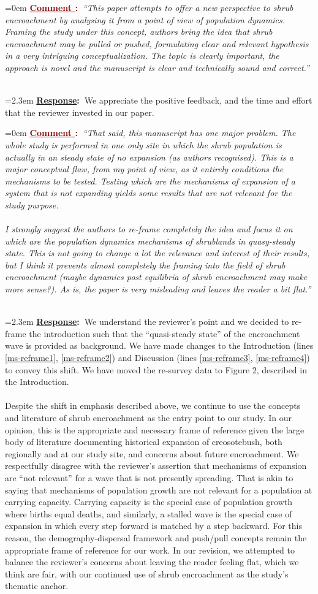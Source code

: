 \documentclass[12pt]{article}
\newcounter{cN}
\newcommand{\comment}[1]{
	\vspace{2em}
	\refstepcounter{cN} %
	\noindent \hangindent=0em \textbf{\textcolor{Maroon}{\uline{Comment \thecN}:~}}\emph{``#1''}
	}
\newcommand{\response}[1]{
	\\[0.25em]
	\hangindent=2.3em \textbf{\textcolor{NavyBlue}{\uline{Response}:~}}#1
	}
\begin{document}
\comment{This paper attempts to offer a new perspective to shrub encroachment by analysing it from a point of view of population dynamics. Framing the study under this concept, authors bring the  idea that shrub encroachment may be pulled or pushed, formulating clear and relevant hypothesis in a very intriguing conceptualization. The topic is clearly important, the approach is novel and the manuscript is clear and technically sound and correct.}
\response{We appreciate the positive feedback, and the time and effort that the reviewer invested in our paper.}

\comment{That said, this manuscript has one major problem. The whole study is performed in one only site in which the shrub population is actually in an steady state of no expansion (as authors recognised). This is a major conceptual flaw, from my point of view, as it entirely conditions the mechanisms to be tested. Testing which are the mechanisms of expansion of a system that is not expanding yields some results that are not relevant for the study purpose.
	\\
	\\
I strongly suggest the authors to re-frame completely the idea and focus it on which are the population dynamics mechanisms of shrublands in quasy-steady state. This is not going to change a lot the relevance and interest of their results, but I think it prevents almost completely the framing into the field of shrub encroachment (maybe dynamics post equilibria of shrub encroachment may make more sense?). As is, the paper is very misleading and leaves the reader a bit flat.}
\response{We understand the reviewer's point and we decided to re-frame the introduction such that the ``quasi-steady state'' of the encroachment wave is provided as background. We have made changes to the Introduction (lines \ref{ms-reframe1}, \ref{ms-reframe2}) and Discussion (lines \ref{ms-reframe3}, \ref{ms-reframe4}) to convey this shift. We have moved the re-survey data to Figure 2, described in the Introduction. 
\\
\\
Despite the shift in emphasis described above, we continue to use the concepts and literature of shrub encroachment as the entry point to our study. In our opinion, this is the appropriate and necessary frame of reference given the large body of literature documenting historical expansion of creosotebush, both regionally and at our study site, and concerns about future encroachment. We respectfully disagree with the reviewer's assertion that mechanisms of expansion are ``not relevant'' for a wave that is not presently spreading. That is akin to saying that mechanisms of population growth are not relevant for a population at carrying capacity. Carrying capacity is the special case of population growth where births equal deaths, and similarly, a stalled wave is the special case of expansion in which every step forward is matched by a step backward. For this reason, the demography-dispersal framework and push/pull concepts remain the appropriate frame of reference for our work. In our revision, we attempted to balance the reviewer's concerns about leaving the reader feeling flat, which we think are fair, with our continued use of shrub encroachment as the study's thematic anchor.}
\end{document}
